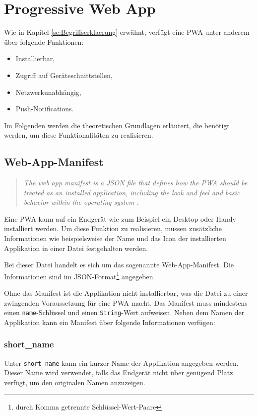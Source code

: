 
\chapter{Progressive Web App}

Wie in Kapitel \ref{se:Begriffserklaerung} erwähnt, verfügt eine PWA unter anderem über folgende Funktionen: 
\begin{itemize}
    \item Installierbar,
    \item Zugriff auf Geräteschnittstellen, 
    \item Netzwerkunabhängig,
    \item Push-Notifications.
\end{itemize} 

Im Folgenden werden die theoretischen Grundlagen erläutert, die benötigt werden, um diese Funktionalitäten zu realisieren. 


\section{Web-App-Manifest}\label{sec:webappmanifest}

\begin{quote}
   \textit{The web app manifest is a JSON file that defines how the PWA should be treated as an installed application, including the look and feel and basic behavior within the operating system \cite{Developers2022}. }
\end{quote}

Eine PWA kann auf ein Endgerät wie zum Beispiel ein Desktop oder Handy installiert werden. Um diese Funktion zu realisieren, müssen zusätzliche Informationen wie beispielsweise der Name und das Icon der installierten Applikation in einer Datei festgehalten werden. 

Bei dieser Datei handelt es sich um das sogenannte Web-App-Manifest. Die Informationen sind im \ac{JSON}-Format\footnote{durch Komma getrennte Schlüssel-Wert-Paare} angegeben. 

Ohne das Manifest ist die Applikation nicht installierbar, was die Datei zu einer zwingenden Voraussetzung für eine PWA macht. 
Das Manifest muss mindestens einen \texttt{name}-Schlüssel und einen \texttt{String}-Wert aufweisen. 
Neben dem Namen der Applikation kann ein Manifest über folgende Informationen verfügen: 

\subsection{short\_name}
Unter \texttt{short\_name} kann ein kurzer Name der Applikation angegeben werden. Dieser Name wird verwendet, falls das Endgerät nicht über genügend Platz verfügt, um den originalen Namen anzuzeigen. 

